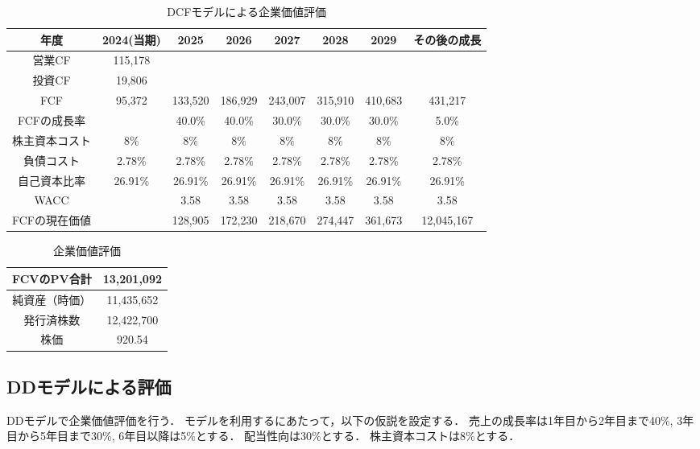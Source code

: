 \documentclass[a4paper]{ltjsarticle}
\begin{document}
\begin{table}[H]
  \begin{center}
    \caption{DCFモデルによる企業価値評価}
    \begin{tabular}{|c|c|c|c|c|c|c|c|} \hline
      年度 & 2024(当期) & 2025 & 2026 & 2027 & 2028 & 2029 & その後の成長 \\ \hline
      営業CF & 115,178 &  &  &  &  &  & \\ \hline
      投資CF & 19,806 &  &  &  &  &  & \\ \hline
      FCF & 95,372 & 133,520 & 186,929 & 243,007 & 315,910 & 410,683 & 431,217 \\ \hline
      FCFの成長率 &  & 40.0\% & 40.0\% & 30.0\% & 30.0\% & 30.0\% & 5.0\% \\ \hline
      株主資本コスト & 8${\%}$ & 8${\%}$ & 8${\%}$ & 8${\%}$ & 8${\%}$ & 8\% & 8\% \\ \hline
      負債コスト & 2.78\% & 2.78\% & 2.78\% & 2.78\% & 2.78\% & 2.78\% & 2.78\% \\ \hline
      自己資本比率 & 26.91\% & 26.91\% & 26.91\% & 26.91\% & 26.91\% & 26.91\% & 26.91\% \\ \hline
      WACC &  & 3.58 & 3.58 & 3.58 & 3.58 & 3.58 & 3.58 \\ \hline
      FCFの現在価値 &  & 128,905 & 172,230 & 218,670 & 274,447 & 361,673 & 12,045,167 \\ \hline
    \end{tabular}
  \end{center}
\end{table}

\begin{table}
  \begin{center}
    \caption{企業価値評価}
    \begin{tabular}{|c|c|} \hline
      FCVのPV合計 & 13,201,092 \\ \hline
      純資産（時価）& 11,435,652 \\ \hline
      発行済株数 & 12,422,700 \\ \hline
      株価 & 920.54 \\ \hline
    \end{tabular}
  \end{center}
\end{table}


\subsection{DDモデルによる評価}
DDモデルで企業価値評価を行う．
モデルを利用するにあたって，以下の仮説を設定する．
売上の成長率は1年目から2年目まで40\%, 3年目から5年目まで30\%, 6年目以降は5\%とする．
配当性向は30\%とする．
株主資本コストは8\%とする．
\end{document}
